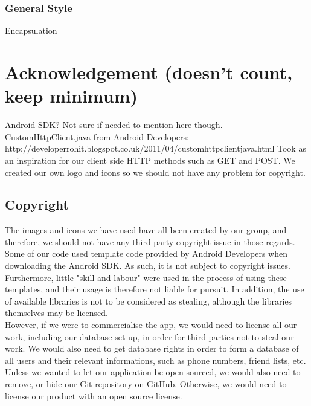 \documentclass[a4paper,11pt]{article}
\begin{document}
\subsubsection*{General Style}
Encapsulation

 
\section{Acknowledgement (doesn’t count, keep minimum)}
Android SDK? Not sure if needed to mention here though.
CustomHttpClient.java from Android Developers: http://developerrohit.blogspot.co.uk/2011/04/customhttpclientjava.html
Took as an inspiration for our client side HTTP methods such as GET and POST.
We created our own logo and icons so we should not have any problem for copyright. 

\subsection*{Copyright}
The images and icons we have used have all been created by our group, and therefore, we should not have any third-party copyright issue in those regards.
Some of our code used template code provided by Android Developers when downloading the Android SDK. As such, it is not subject to copyright issues. Furthermore, little "skill and labour" were used in the process of using these templates, and their usage is therefore not liable for pursuit. In addition, the use of available libraries is not to be considered as stealing, although the libraries themselves may be licensed.\\
However, if we were to commercialise the app, we would need to license all our work, including our database set up, in order for third parties not to steal our work. We would also need to get database rights in order to form a database of all users and their relevant informations, such as phone numbers, friend lists, etc. \\
Unless we wanted to let our application be open sourced, we would also need to remove, or hide our Git repository on GitHub. Otherwise, we would need to license our product with an open source license.
\end{document}
